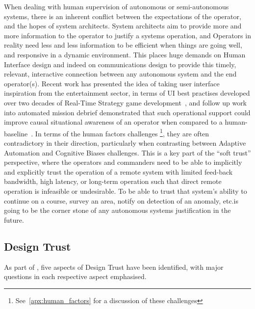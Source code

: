 When dealing with human supervision of autonomous or semi-autonomous systems, there is an inherent conflict between the expectations of the operator, and the hopes of system architects.
System architects aim to provide more and more information to the operator to justify a systems operation, and Operators in reality need less and less information to be efficient when things are going well, and responsive in a dynamic environment.
This places huge demands on Human Interface design and indeed on communications design to provide this timely, relevant, interactive connection between any autonomous system and the end operator(s).
Recent work has presented the idea of taking user interface inspiration from the entertainment sector, in terms of UI best practises developed over two decades of Real-Time Strategy game development~\cite{Johnson2007}, and follow up work into automated mission debrief demonstrated that such operational support could improve causal situational awareness of an operator when compared to a human-baseline~\cite{Johnson2011}.
In terms of the human factors challenges \footnote{See~\autoref{apx:human_factors} for a discussion of these challenges}, they are often contradictory in their direction, particularly when contrasting between Adaptive Automation and Cognitive Biases challenges.
This is a key part of the ``soft trust'' perspective, where the operators and commanders need to be able to implicitly and explicitly trust the operation of a remote system with limited feed-back bandwidth, high latency, or long-term operation such that direct remote operation is infeasible or undesirable.
To be able to trust that system's ability to continue on a course, survey an area, notify on detection of an anomaly, etc.is going to be the corner stone of any autonomous systems justification in the future.

\subsection{Design Trust}\label{sec:design_trust}

As part of \cite{Bolster2014a}, five aspects of Design Trust have been identified, with major questions in each respective aspect emphasised.

